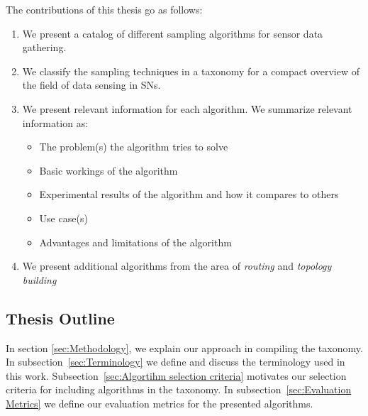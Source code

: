 The contributions of this thesis go as follows: 
\begin{enumerate}
    \item We present a catalog of different sampling algorithms for sensor data
    gathering.
    \item We classify the sampling techniques in a taxonomy for a compact
    overview of the field of data sensing in \acp{SN}.
    \item We present relevant information for each algorithm. We summarize
    relevant information as:

        \begin{itemize}
            \item The problem(s) the algorithm tries to solve
            \item Basic workings of the algorithm
            \item Experimental results of the algorithm and how it compares to others
            \item Use case(s)
            \item Advantages and limitations of the algorithm
        \end{itemize}


    \item We present additional algorithms from the area of \textit{routing}
    and \textit{topology building}

\end{enumerate}


\subsection{Thesis Outline}

  In section \ref{sec:Methodology}, we
explain our approach in compiling the taxonomy. In
subsection~\ref{sec:Terminology} we define and discuss the terminology used in
this work. Subsection~\ref{sec:Algortihm selection criteria} motivates our
selection criteria for including algorithms in the taxonomy. In
subsection~\ref{sec:Evaluation Metrics} we define our evaluation metrics for
the presented algorithms.

